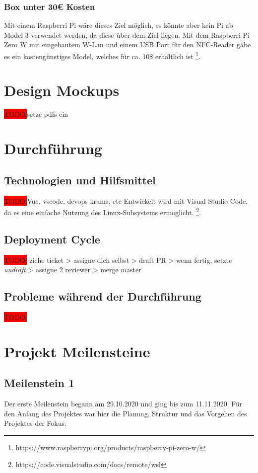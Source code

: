 \documentclass[10pt, a4paper, draft]{article}
\begin{document}
\subsubsection{Box unter 30€ Kosten}
Mit einem Raspberri Pi wäre dieses Ziel möglich, es könnte aber kein Pi ab Model 3 verwendet werden, da diese über dem Ziel liegen.
Mit dem Raspberri Pi Zero W mit eingebautem W-Lan und einem USB Port für den NFC-Reader gäbe es ein kostengünstiges Model, welches für ca. 10\$ erhältlich ist \footnote{https://www.raspberrypi.org/products/raspberry-pi-zero-w/}.

\section{Design Mockups}
\colorbox{red}{TODO:}setze pdfs ein

\section{Durchführung}

\subsection{Technologien und Hilfsmittel}
\colorbox{red}{TODO:}Vue, vscode, devops krams, etc
Entwickelt wird mit Visual Studio Code, da es eine einfache Nutzung des Linux-Subsystems ermöglicht. \footnote{https://code.visualstudio.com/docs/remote/wsl}.

\subsection{Deployment Cycle}
\colorbox{red}{TODO:} ziehe ticket > assigne dich selbst > draft PR > wenn fertig, setzte \textit{undraft} > assigne 2 reviewer > merge master

\subsection{Probleme während der Durchführung}
\colorbox{red}{TODO:}




\section{Projekt Meilensteine}

\subsection{Meilenstein 1}
Der erste Meilenstein begann am 29.10.2020 und ging bis zum 11.11.2020. Für den Anfang des Projektes war hier die Planung, Struktur und das Vorgehen des Projektes der Fokus.
\end{document}
